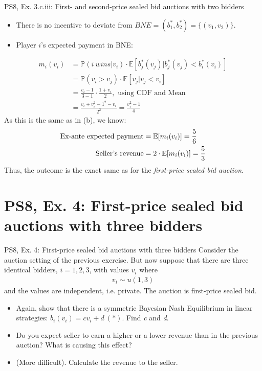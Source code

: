 \begin{frame}{PS8, Ex. 3.c.iii: First- and second-price sealed bid auctions with two bidders}
\begin{multicols}{2}
\begin{itemize}
        \item[(ii)] There is no incentive to deviate from $BNE=(b_1^*,b_2^*)=\{(v_1,v_2)\}$.
        \item[(iii)] Player $i$'s expected payment in BNE:
      \end{itemize}
      \vspace{-12pt}
      \begin{align*}
        m_i(v_i)&=\mathbb{P}(i\ wins|v_i)\cdot\mathbb{E}[b_j^*(v_j)|b_j^*(v_j)<b_i^*(v_i)]\\
                &=\mathbb{P}(v_i>v_j)\cdot\mathbb{E}[v_j|v_j<v_i]\\
                &=\frac{v_i-1}{3-1}\cdot\frac{1+v_i}{2},\text{ using CDF and Mean}\\
                &=\frac{v_i+v_i^2-1^2-v_i}{2^2}=\frac{v_i^2-1}{4}
      \end{align*}
      As this is the same as in (b), we know:
      \vspace{-8pt}
      \begin{align*}\vspace{-4pt}
        \text{Ex-ante expected payment}&=\mathbb{E}[m_i(v_i)]=\frac{5}{6}\\
        \text{Seller's revenue}&=2\cdot\mathbb{E}[m_i(v_i)]=\frac{5}{3}
      \end{align*}
      Thus, the outcome is the exact same as for the \textit{first-price sealed bid auction}.
      \vfill\null
    \end{multicols}
\end{frame}



\section{PS8, Ex. 4: First-price sealed bid auctions with three bidders}

\begin{frame}{PS8, Ex. 4: First-price sealed bid auctions with three bidders}
    Consider the auction setting of the previous exercise. But now suppose that there are three identical bidders, $i = 1, 2, 3$, with values $v_i$ where
    \begin{align*}
      v_i\sim u(1, 3)
    \end{align*}
    and the values are independent, i.e. private. The auction is first-price sealed bid.
    \begin{itemize}
      \item[(a)] Again, show that there is a symmetric Bayesian Nash Equilibrium in linear strategies: $b_i(v_i) = cv_i + d\ (*)$. Find \textit{c} and \textit{d}.
      \item[(b)] Do you expect seller to earn a higher or a lower revenue than in the previous auction? What is causing this effect?
      \item[(c)] (More difficult). Calculate the revenue to the seller.
    \end{itemize}
    \vfill\null
\end{frame}

